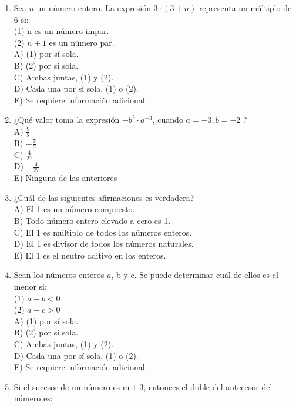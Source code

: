 \documentclass[10pt]{article}
\begin{document}
\begin{enumerate}
A) $a$ y $b$ son ambos pares.\\
B) $a$ y $b$ son ambos impares.\\
C) $a$ es par y $b$ es impar.\\
D) $a$ es impar y $b$ es par.
  \item Sea $n$ un número entero. La expresión $3 \cdot(3+n)$ representa un múltiplo de 6 si:\\
(1) n es un número impar.\\
(2) $n+1$ es un número par.\\
A) (1) por sí sola.\\
B) (2) por sí sola.\\
C) Ambas juntas, (1) y (2).\\
D) Cada una por sí sola, (1) o (2).\\
E) Se requiere información adicional.
  \item ¿Qué valor toma la expresión $-b^{2} \cdot a^{-3}$, cuando $a=-3, b=-2$ ?\\
A) $\frac{9}{8}$\\
B) $-\frac{7}{9}$\\
C) $\frac{4}{27}$\\
D) $-\frac{4}{27}$\\
E) Ninguna de las anteriores
  \item ¿Cuál de las siguientes afirmaciones es verdadera?\\
A) El 1 es un número compuesto.\\
B) Todo número entero elevado a cero es 1.\\
C) El 1 es múltiplo de todos los números enteros.\\
D) El 1 es divisor de todos los números naturales.\\
E) El 1 es el neutro aditivo en los enteros.
  \item Sean los números enteros $a$, b y c. Se puede determinar cuál de ellos es el menor si:\\
(1) $a-b<0$\\
(2) $a-c>0$\\
A) (1) por sí sola.\\
B) (2) por sí sola.\\
C) Ambas juntas, (1) y (2).\\
D) Cada una por sí sola, (1) o (2).\\
E) Se requiere información adicional.
  \item Si el sucesor de un número es $\mathrm{m}+3$, entonces el doble del antecesor del número es:\\

\end{enumerate}
\end{document}

